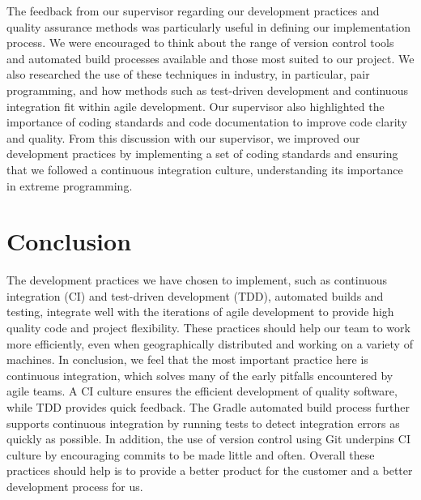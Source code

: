 \documentclass[10pt, a4paper]{article}
\begin{document}
The feedback from our supervisor regarding our development practices and quality assurance methods was particularly useful in defining our implementation process. We were encouraged to think about the range of version control tools and automated build processes available and those most suited to our project. We also researched the use of these techniques in industry, in particular, pair programming, and how methods such as test-driven development and continuous integration fit within agile development. Our supervisor also highlighted the importance of coding standards and code documentation to improve code clarity and quality. From this discussion with our supervisor, we improved our development practices by implementing a set of coding standards and ensuring that we followed a continuous integration culture, understanding its importance in extreme programming. 

\section{Conclusion}

The development practices we have chosen to implement, such as continuous integration (CI) and test-driven development (TDD), automated builds and testing, integrate well with the iterations of agile development to provide high quality code and project flexibility. These practices should help our team to work more efficiently, even when geographically distributed and working on a variety of machines. In conclusion, we feel that the most important practice here is continuous integration, which solves many of the early pitfalls encountered by agile teams. A CI culture ensures the efficient development of quality software, while TDD provides quick feedback. The Gradle automated build process further supports continuous integration by running tests to detect integration errors as quickly as possible. In addition, the use of version control using Git underpins CI culture by encouraging commits to be made little and often. Overall these practices should help is to provide a better product for the customer and a better development process for us. 
\end{document}

